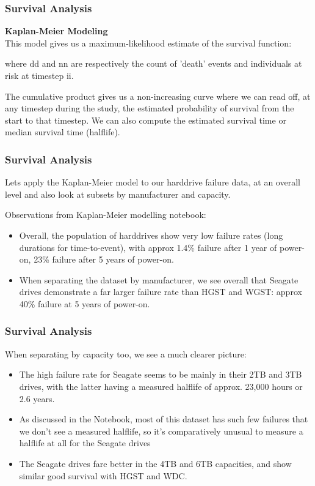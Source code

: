 \documentclass[]{beamer}
\begin{document}
	\begin{frame}
		\frametitle{Survival Analysis}
		\noindent \textbf{Kaplan-Meier Modeling} \\
		
		This model gives us a maximum-likelihood estimate of the survival function:
		
		where dd and nn are respectively the count of 'death' events and individuals at risk at timestep ii.
		
		The cumulative product gives us a non-increasing curve where we can read off, at any timestep during the study, the estimated probability of survival from the start to that timestep. We can also compute the estimated survival time or median survival time (halflife).
	\end{frame}
	\begin{frame}
		\frametitle{Survival Analysis}
		Lets apply the Kaplan-Meier model to our harddrive failure data, at an overall level and also look at subsets by manufacturer and capacity.
		
		
		Observations from Kaplan-Meier modelling notebook:
		
		\begin{itemize}
			\item Overall, the population of harddrives show very low failure rates (long durations for time-to-event), with approx 1.4\% failure after 1 year of power-on, 23\% failure after 5 years of power-on.
			\item When separating the dataset by manufacturer, we see overall that Seagate drives demonstrate a far larger failure rate than HGST and WGST: approx 40\% failure at 5 years of power-on.
		\end{itemize}
		
		
	\end{frame}
	\begin{frame}
		\frametitle{Survival Analysis}
		
		When separating by capacity too, we see a much clearer picture:
		\begin{itemize}
			\item The high failure rate for Seagate seems to be mainly in their 2TB and 3TB drives, with the latter having a measured halflife of approx. 23,000 hours or 2.6 years.
			\item As discussed in the Notebook, most of this dataset has such few failures that we don't see a measured halflife, so it's comparatively unusual to measure a halflife at all for the Seagate drives
			\item The Seagate drives fare better in the 4TB and 6TB capacities, and show similar good survival with HGST and WDC.
		\end{itemize}
		
	\end{frame}
\end{document}

